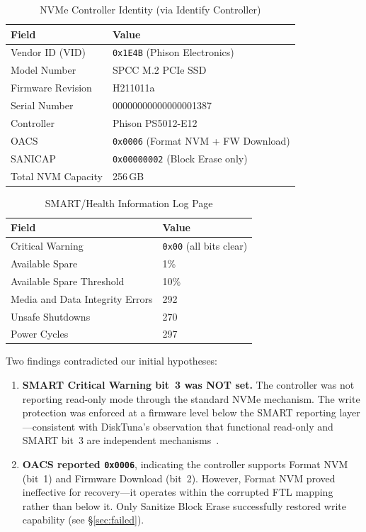 \documentclass[conference]{IEEEtran}
\begin{document}
\begin{table}[ht]
\centering
\caption{NVMe Controller Identity (via Identify Controller)}
\label{tab:identity}
\begin{tabular}{@{}ll@{}}
\toprule
Field & Value \\
\midrule
Vendor ID (VID) & \texttt{0x1E4B} (Phison Electronics) \\
Model Number & SPCC M.2 PCIe SSD \\
Firmware Revision & H211011a \\
Serial Number & 00000000000000001387 \\
Controller & Phison PS5012-E12 \\
OACS & \texttt{0x0006} (Format NVM + FW Download) \\
SANICAP & \texttt{0x00000002} (Block Erase only) \\
Total NVM Capacity & 256\,GB \\
\bottomrule
\end{tabular}
\end{table}

\begin{table}[ht]
\centering
\caption{SMART/Health Information Log Page}
\label{tab:smart}
\begin{tabular}{@{}ll@{}}
\toprule
Field & Value \\
\midrule
Critical Warning & \texttt{0x00} (all bits clear) \\
Available Spare & 1\% \\
Available Spare Threshold & 10\% \\
Media and Data Integrity Errors & 292 \\
Unsafe Shutdowns & 270 \\
Power Cycles & 297 \\
\bottomrule
\end{tabular}
\end{table}

Two findings contradicted our initial hypotheses:

\begin{enumerate}
\item \textbf{SMART Critical Warning bit~3 was NOT set.} The controller
  was not reporting read-only mode through the standard NVMe mechanism.
  The write protection was enforced at a firmware level below the
  SMART reporting layer---consistent with DiskTuna's observation that
  functional read-only and SMART bit~3 are independent
  mechanisms~\cite{disktuna-wp}.

\item \textbf{OACS reported \texttt{0x0006}}, indicating the controller
  supports Format NVM (bit~1) and Firmware Download (bit~2). However,
  Format NVM proved ineffective for recovery---it operates within the
  corrupted FTL mapping rather than below it. Only Sanitize Block Erase
  successfully restored write capability (see \S\ref{sec:failed}).
\end{enumerate}
\end{document}
